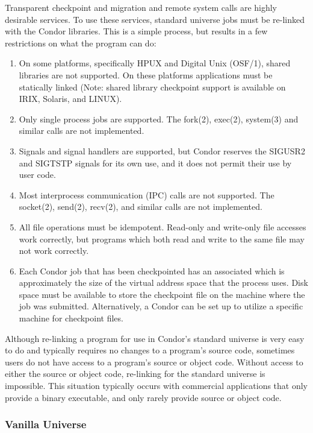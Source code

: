 Transparent checkpoint and migration and remote system calls are highly
desirable services. To use these services, standard universe jobs must be
re-linked with the Condor libraries. This is a simple process,
but results in
a few restrictions on what the program can do:
\begin{enumerate}
	\item On some platforms, specifically HPUX and Digital Unix
(OSF/1), shared libraries are not supported. On these
platforms applications must be statically linked (Note: shared library
checkpoint support is available on IRIX, Solaris, and LINUX). 
	\item Only single process jobs are supported. The fork(2), exec(2),
system(3) and similar calls are not implemented.
	\item Signals and signal handlers are supported, but Condor reserves the 
SIGUSR2 and SIGTSTP signals for its own use, and it does not permit their use by user code.
	\item Most interprocess communication (IPC) calls are not supported.
The socket(2), send(2), recv(2), and similar calls are not implemented.
	\item All file operations must be idempotent. Read-only and
write-only file accesses work correctly, but programs which both
read and write to the same file may not work correctly.
	\item Each Condor job that has been checkpointed has an associated 
 which is approximately the size of the virtual
address space that the process uses.
Disk space must be available to store the checkpoint file on the 
machine where the job was submitted. 
Alternatively, a Condor  can be set up to utilize
a specific machine for checkpoint files.
\end{enumerate}

Although re-linking a program for use in Condor's standard universe is
very easy to do and typically requires no changes to a program's
source code, sometimes users do not have
access to a program's source or object code.
Without access to
either the source or object code, re-linking for the standard universe is
impossible. This situation typically occurs with commercial applications
that only provide a binary executable, and only rarely provide
source or object code.

\subsubsection{Vanilla Universe}

